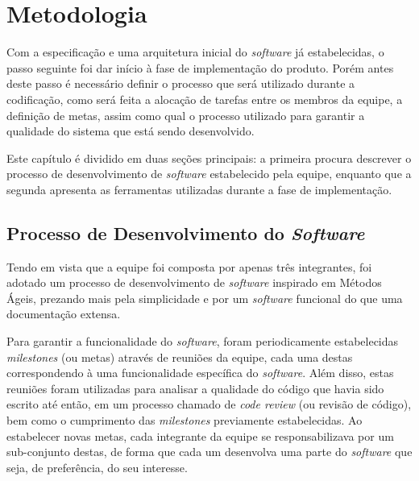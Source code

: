 
\chapter{Metodologia}
\label{metod}


Com a especificação e uma arquitetura inicial do \emph{software} já estabelecidas, o passo seguinte foi dar início à fase de implementação do produto.
Porém antes deste passo é necessário definir o processo que será utilizado durante a codificação, como será feita a alocação de tarefas entre os membros da equipe, a definição de metas, assim como qual o processo utilizado para garantir a qualidade do sistema que está sendo desenvolvido.

Este capítulo é dividido em duas seções principais: a primeira procura descrever o processo de desenvolvimento de \emph{software} estabelecido pela equipe, enquanto que a segunda apresenta as ferramentas utilizadas durante a fase de implementação.


\section{Processo de Desenvolvimento do \emph{Software}}

Tendo em vista que a equipe foi composta por apenas três integrantes, foi adotado um processo de desenvolvimento de \emph{software} inspirado em Métodos Ágeis, prezando mais pela simplicidade e por um \emph{software} funcional do que uma documentação extensa.

Para garantir a funcionalidade do \emph{software}, foram periodicamente estabelecidas \emph{milestones} (ou metas) através de reuniões da equipe, cada uma destas correspondendo à uma funcionalidade específica do \emph{software}.
Além disso, estas reuniões foram utilizadas para analisar a qualidade do código que havia sido escrito até então, em um processo chamado de \emph{code review} (ou revisão de código), bem como o cumprimento das \emph{milestones} previamente estabelecidas.
Ao estabelecer novas metas, cada integrante da equipe se responsabilizava por um sub-conjunto destas, de forma que cada um desenvolva uma parte do \emph{software} que seja, de preferência, do seu interesse.


